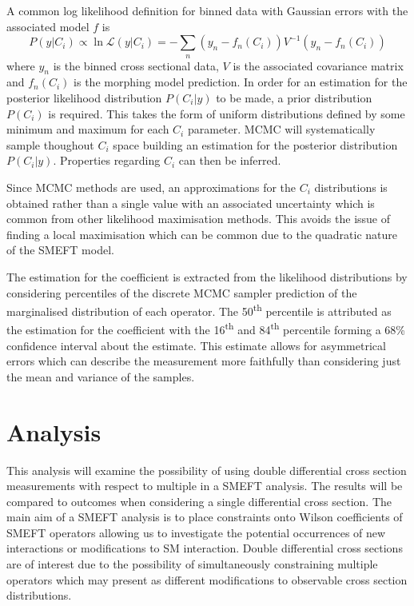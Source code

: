 \documentclass[a4paper,11pt]{article}
\newcommand{\ts}{\textsuperscript}
\begin{document}
A common log likelihood definition for binned data with Gaussian errors with the associated model $f$ is
\begin{equation}
    P(y | C_{i}) \propto \ln\mathcal{L}(y | C_{i}) = -\sum\limits_{n} (y_{n} - f_{n}(C_{i})) V^{-1} (y_{n} - f_{n}(C_{i}))
\end{equation}
where $y_{n}$ is the binned cross sectional data, $V$ is the associated covariance matrix and $f_{n}(C_{i})$ is the morphing model prediction.
In order for an estimation for the posterior likelihood distribution $P(C_{i} | y)$ to be made, a prior distribution $P(C_{i})$ is required.
This takes the form of uniform distributions defined by some minimum and maximum for each $C_{i}$ parameter.
MCMC will systematically sample thoughout $C_{i}$ space building an estimation for the posterior distribution $P(C_{i}|y)$.
Properties regarding $C_{i}$ can then be inferred.

Since MCMC methods are used, an approximations for the $C_{i}$ distributions is obtained rather than a single value with an associated uncertainty which is common from other likelihood maximisation methods.
This avoids the issue of finding a local maximisation which can be common due to the quadratic nature of the SMEFT model.

The estimation for the coefficient is extracted from the likelihood distributions by considering percentiles of the discrete MCMC sampler prediction of the marginalised distribution of each operator.
The 50\ts{th} percentile is attributed as the estimation for the coefficient with the 16\ts{th} and 84\ts{th} percentile forming a 68\% confidence interval about the estimate.
This estimate allows for asymmetrical errors which can describe the measurement more faithfully than considering just the mean and variance of the samples.


\section{Analysis}
This analysis will examine the possibility of using double differential cross section measurements with respect to multiple in a SMEFT analysis.
The results will be compared to outcomes when considering a single differential cross section.
The main aim of a SMEFT analysis is to place constraints onto Wilson coefficients of SMEFT operators allowing us to investigate the potential occurrences of new interactions or modifications to SM interaction.
Double differential cross sections are of interest due to the possibility of simultaneously constraining multiple operators which may present as different modifications to observable cross section distributions.
\end{document}

